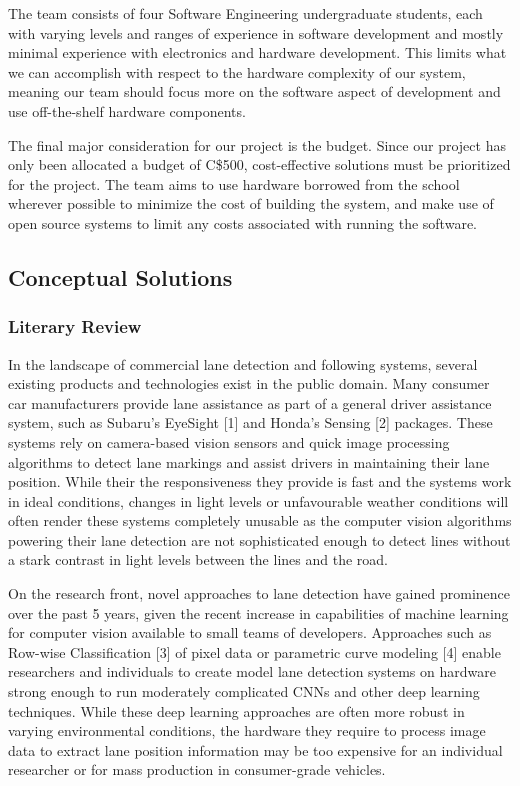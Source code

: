 \documentclass[titlepage]{article}
\begin{document}
The team consists of four Software Engineering undergraduate students, each with varying levels and ranges of experience in software development and mostly minimal experience with electronics and hardware development. This limits what we can accomplish with respect to the hardware complexity of our system, meaning our team should focus more on the software aspect of development and use off-the-shelf hardware components.

The final major consideration for our project is the budget. Since our project has only been allocated a budget of C\$500, cost-effective solutions must be prioritized for the project. The team aims to use hardware borrowed from the school wherever possible to minimize the cost of building the system, and make use of open source systems to limit any costs associated with running the software.

\subsection{Conceptual Solutions}

\subsubsection{Literary Review}

In the landscape of commercial lane detection and following systems, several existing products and technologies exist in the public domain. Many consumer car manufacturers provide lane assistance as part of a general driver assistance system, such as Subaru’s EyeSight [1] and Honda’s Sensing [2] packages. These systems rely on camera-based vision sensors and quick image processing algorithms to detect lane markings and assist drivers in maintaining their lane position. While their the responsiveness they provide is fast and the systems work in ideal conditions, changes in light levels or unfavourable weather conditions will often render these systems completely unusable as the computer vision algorithms powering their lane detection are not sophisticated enough to detect lines without a stark contrast in light levels between the lines and the road.


On the research front, novel approaches to lane detection have gained prominence over the past 5 years, given the recent increase in capabilities of machine learning for computer vision available to small teams of developers. Approaches such as Row-wise Classification [3] of pixel data or parametric curve modeling [4] enable researchers and individuals to create model lane detection systems on hardware strong enough to run moderately complicated CNNs and other deep learning techniques. While these deep learning approaches are often more robust in varying environmental conditions, the hardware they require to process image data to extract lane position information may be too expensive for an individual researcher or for mass production in consumer-grade vehicles.
\end{document}
